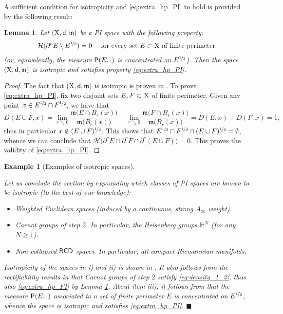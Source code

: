\documentclass[reqno]{amsart}
\numberwithin{equation}{section}
\newcommand{\X}{{\rm X}}
\newcommand{\sfd}{{\sf d}}
\newcommand{\mm}{\mathfrak m}
\newcommand{\1}{\mathbbm 1}
\renewcommand{\P}{{\sf P}}
\renewcommand{\H}{{\mathcal H}}
\newcommand{\fr}{\penalty-20\null\hfill\(\blacksquare\)}
\newtheorem{lemma}[theorem]{Lemma}
\newtheorem{example}[theorem]{Example}
\begin{document}
%
%
A sufficient condition for isotropicity and \eqref{eq:extra_hp_PI} to hold
is provided by the following result:
%
%
\begin{lemma}\label{lem:suff_cond_isotr}
Let \((\X,\sfd,\mm)\) be a PI space with the following property:
\begin{equation}\label{eq:density_1_2}
\H(\partial^e E\setminus E^{\nicefrac{1}{2}})=0\quad
\text{ for every set }E\subset\X\text{ of finite perimeter}
\end{equation}
(or, equivalently, the measure \(\P(E,\cdot)\)
is concentrated on \(E^{\nicefrac{1}{2}}\)). Then the space \((\X,\sfd,\mm)\)
is isotropic and satisfies property \eqref{eq:extra_hp_PI}.
\end{lemma}
\begin{proof}
The fact that \((\X,\sfd,\mm)\) is isotropic is proven in \cite[Remark 6.3]{AMP04}.
To prove \eqref{eq:extra_hp_PI}, fix two disjoint sets \(E,F\subset\X\)
of finite perimeter. Given any point \(x\in E^{\nicefrac{1}{2}}\cap F^{\nicefrac{1}{2}}\),
we have that
\[
D(E\cup F,x)=\lim_{r\searrow 0}\frac{\mm\big(E\cap B_r(x)\big)}{\mm\big(B_r(x)\big)}+
\lim_{r\searrow 0}\frac{\mm\big(F\cap B_r(x)\big)}{\mm\big(B_r(x)\big)}=D(E,x)+D(F,x)=1,
\]
thus in particular \(x\notin(E\cup F)^{\nicefrac{1}{2}}\). This shows that
\(E^{\nicefrac{1}{2}}\cap F^{\nicefrac{1}{2}}\cap(E\cup F)^{\nicefrac{1}{2}}=\emptyset\),
whence we can conclude that
\(\H\big(\partial^e E\cap\partial^e F\cap\partial^e(E\cup F)\big)=0\).
This proves the validity of \eqref{eq:extra_hp_PI}.
\end{proof}
%
%
\begin{example}[Examples of isotropic spaces]\label{ex:isotr_spaces}{\rm
Let us conclude the section by expounding which classes of PI spaces
are known to be isotropic (to the best of our knowledge):
\begin{itemize}
\item[\(\rm i)\)] Weighted Euclidean spaces (induced by a continuous,
strong \(A_\infty\) weight).
\item[\(\rm ii)\)] Carnot groups of step \(2\).
In particular, the Heisenberg groups \(\mathbb H^N\) (for any \(N\geq 1\)). 
\item[\(\rm iii)\)] Non-collapsed \(\sf RCD\) spaces.
In particular, all compact Riemannian manifolds.
\end{itemize}
Isotropicity of the spaces in i) and ii) is shown in \cite[Section 7]{AMP04}.
It also follows from the rectifiability results in \cite{FSSC01,FSSC03}
that Carnot groups of step \(2\) satisfy \eqref{eq:density_1_2}, thus also
\eqref{eq:extra_hp_PI} by Lemma \ref{lem:suff_cond_isotr}.
About item iii), it follows from \cite[Corollary 4.4]{ABS18} that the
measure \(\P(E,\cdot)\) associated to a set of finite perimeter \(E\) is
concentrated on \(E^{\nicefrac{1}{2}}\), whence the space is isotropic and
satisfies \eqref{eq:extra_hp_PI}.
\fr}\end{example}
%
%
\end{document}
